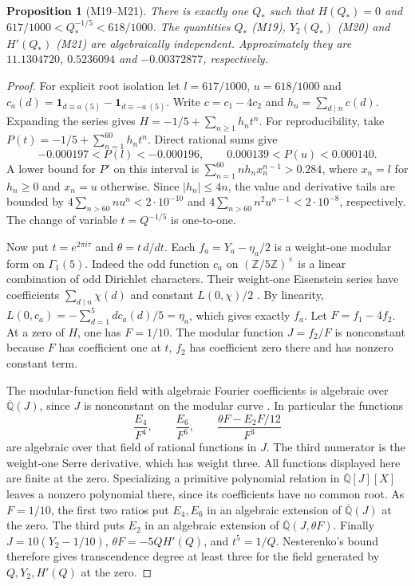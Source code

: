 \documentclass[11pt,a4paper]{article}
\newtheorem{proposition}[theorem]{Proposition}
\theoremstyle{definition}
\theoremstyle{remark}
\begin{document}
\par\hypertarget{cat-M19}{}\label{page:M19}\hypertarget{cat-M20}{}\label{page:M20}\hypertarget{cat-M21}{}\label{page:M21}
\begin{proposition}[M19--M21]
There is exactly one $Q_*$ such that $H(Q_*)=0$ and
$617/1000<Q_*^{-1/5}<618/1000$.
The quantities $Q_*$ (M19), $Y_2(Q_*)$ (M20) and $H'(Q_*)$ (M21) are
algebraically independent. Approximately they are $11.1304720$, $0.5236094$
and $-0.00372877$, respectively.
\end{proposition}
\begin{proof}
For explicit root isolation let $l=617/1000$, $u=618/1000$ and
$c_a(d)=\mathbf{1}_{d\equiv a\ (5)}-\mathbf{1}_{d\equiv-a\ (5)}$. Write
$c=c_1-4c_2$ and $h_n=\sum_{d\mid n}c(d)$. Expanding the series gives
$H=-1/5+\sum_{n\ge1}h_nt^n$. For reproducibility, take
$P(t)=-1/5+\sum_{n=1}^{60}h_nt^n$. Direct rational sums give
\[
 -0.000197<P(l)<-0.000196,\qquad
 0.000139<P(u)<0.000140 .
\]
A lower bound for $P'$ on this interval is
$\sum_{n=1}^{60}n h_n x_n^{n-1}>0.284$, where $x_n=l$ for $h_n\ge0$
and $x_n=u$ otherwise. Since $|h_n|\le4n$, the value and derivative
tails are bounded by $4\sum_{n>60}nu^n<2\cdot10^{-10}$ and
$4\sum_{n>60}n^2u^{n-1}<2\cdot10^{-8}$, respectively.
The change of variable $t=Q^{-1/5}$ is one-to-one.

Now put $t=e^{2\pi i\tau}$ and $\theta=t\,d/dt$. Each
$f_a=Y_a-\eta_a/2$ is a weight-one modular form on $\Gamma_1(5)$.
Indeed the odd function $c_a$ on $(\mathbb Z/5\mathbb Z)^\times$ is a
linear combination of odd Dirichlet characters. Their weight-one Eisenstein
series have coefficients $\sum_{d\mid n}\chi(d)$ and constant $L(0,\chi)/2$
\cite[\S4.8]{mDiamond}. By linearity,
$L(0,c_a)=-\sum_{d=1}^{5}dc_a(d)/5=\eta_a$, which gives exactly $f_a$.
Let $F=f_1-4f_2$. At a zero of $H$, one has $F=1/10$.
The modular function $J=f_2/F$ is nonconstant because $F$ has coefficient one
at $t$, $f_2$ has coefficient zero there and has nonzero constant term.

The modular-function field with algebraic Fourier coefficients is algebraic
over $\overline{\mathbb Q}(J)$, since $J$ is nonconstant on the modular
curve \cite{mDiamond,mBhowmik}. In particular the functions
\[
 \frac{E_4}{F^4},\qquad \frac{E_6}{F^6},\qquad
 \frac{\theta F-E_2F/12}{F^3}
\]
are algebraic over that field of rational functions in $J$. The third
numerator is the weight-one Serre derivative, which has weight three.
All functions displayed here are finite at the zero. Specializing a
primitive polynomial relation in $\overline{\mathbb Q}[J][X]$ leaves a
nonzero polynomial there, since its coefficients have no common root.
As $F=1/10$, the first two ratios put $E_4,E_6$ in an algebraic extension
of $\overline{\mathbb Q}(J)$ at the zero. The third puts $E_2$ in an
algebraic extension of $\overline{\mathbb Q}(J,\theta F)$.
Finally $J=10(Y_2-1/10)$, $\theta F=-5QH'(Q)$, and $t^5=1/Q$.
Nesterenko's bound therefore gives transcendence degree at least three for
the field generated by $Q,Y_2,H'(Q)$ at the zero.
\end{proof}
\end{document}

